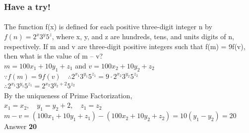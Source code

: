 \documentclass[
	11pt, %
	handout,
]{beamer}
\begin{document}
\begin{frame}
	\frametitle{Have a try!}
	\framesubtitle{}
	The function f(x) is defined for each positive three-digit integer n by $f(n) = 2^x3^y5^z$,
where x, y, and z are hundreds, tens, and units digits of n, respectively. If m and v are
three-digit positive integers such that f(m) = 9f(v), then what is the value of m – v? \\
\bigskip
\pause
$m=100x_1 + 10y_1 + z_1$ and $v = 100x_2 + 10y_2 + z_2$\\
$\because f(m) = 9f(v) \quad \therefore 2^{x_1}3^{y_1}5^{z_1} = 9\cdot2^{x_2}3^{y_2}5^{z_2}$\\
$\therefore 2^{x_1}3^{y_1}5^{z_1} = 2^{x_2}3^{y_2 +2}5^{z_2}$ \\
\smallskip
By the uniqueness of Prime Factorization,\\
$x_1 = x_2, \quad y_1 = y_2 + 2,  \quad z_1 = z_2$\\
$m - v = (100x_1 + 10y_1 + z_1) - (100x_2 + 10y_2 + z_2) = 10(y_1 -y_2) = 20$\\

\bigskip
Answer \textbf{20}
\end{frame}

\end{document}
